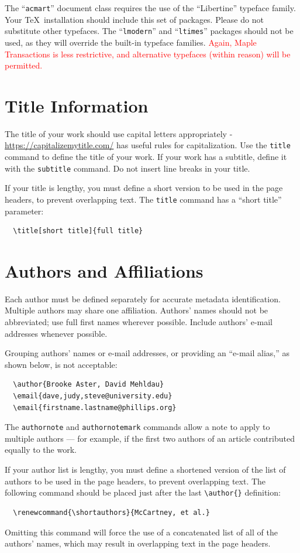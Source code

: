 \documentclass[anonymous,review,acmsmall,screen]{MapleTrans}
\begin{document}
The ``\verb|acmart|'' document class requires the use of the
``Libertine'' typeface family. Your \TeX\ installation should include
this set of packages. Please do not substitute other typefaces. The
``\verb|lmodern|'' and ``\verb|ltimes|'' packages should not be used,
as they will override the built-in typeface families.
\textcolor{red}{Again, Maple Transactions is less restrictive, and alternative typefaces (within reason) will be permitted.}


\section{Title Information}

The title of your work should use capital letters appropriately -
\url{https://capitalizemytitle.com/} has useful rules for
capitalization. Use the {\verb|title|} command to define the title of
your work. If your work has a subtitle, define it with the
{\verb|subtitle|} command.  Do not insert line breaks in your title.

If your title is lengthy, you must define a short version to be used
in the page headers, to prevent overlapping text. The \verb|title|
command has a ``short title'' parameter:
\begin{verbatim}
  \title[short title]{full title}
\end{verbatim}

\section{Authors and Affiliations}

Each author must be defined separately for accurate metadata
identification. Multiple authors may share one affiliation. Authors'
names should not be abbreviated; use full first names wherever
possible. Include authors' e-mail addresses whenever possible.

Grouping authors' names or e-mail addresses, or providing an ``e-mail
alias,'' as shown below, is not acceptable:
\begin{verbatim}
  \author{Brooke Aster, David Mehldau}
  \email{dave,judy,steve@university.edu}
  \email{firstname.lastname@phillips.org}
\end{verbatim}

The \verb|authornote| and \verb|authornotemark| commands allow a note
to apply to multiple authors --- for example, if the first two authors
of an article contributed equally to the work.

If your author list is lengthy, you must define a shortened version of
the list of authors to be used in the page headers, to prevent
overlapping text. The following command should be placed just after
the last \verb|\author{}| definition:
\begin{verbatim}
  \renewcommand{\shortauthors}{McCartney, et al.}
\end{verbatim}
Omitting this command will force the use of a concatenated list of all
of the authors' names, which may result in overlapping text in the
page headers.
\end{document}
